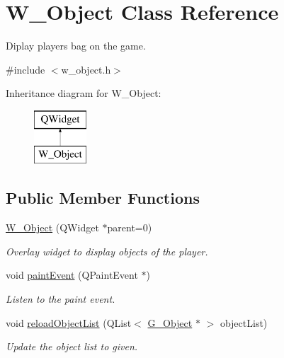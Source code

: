 \hypertarget{class_w___object}{}\section{W\+\_\+\+Object Class Reference}
\label{class_w___object}


Diplay player\textquotesingle{}s bag on the game.  




{\ttfamily \#include $<$w\+\_\+object.\+h$>$}

Inheritance diagram for W\+\_\+\+Object\+:\begin{figure}[H]
\begin{center}
\leavevmode
\includegraphics[height=2.000000cm]{class_w___object}
\end{center}
\end{figure}
\subsection*{Public Member Functions}
\begin{DoxyCompactItemize}
\item 
\hyperlink{class_w___object_a0b72570f71d65c67ca649cc76c3077cf}{W\+\_\+\+Object} (Q\+Widget $\ast$parent=0)
\begin{DoxyCompactList}\small\item\em Overlay widget to display objects of the player. \end{DoxyCompactList}\item 
\hypertarget{class_w___object_ab0e3dcaabbbcfeab50b4a449e667b56d}{}void \hyperlink{class_w___object_ab0e3dcaabbbcfeab50b4a449e667b56d}{paint\+Event} (Q\+Paint\+Event $\ast$)\label{class_w___object_ab0e3dcaabbbcfeab50b4a449e667b56d}

\begin{DoxyCompactList}\small\item\em Listen to the paint event. \end{DoxyCompactList}\item 
void \hyperlink{class_w___object_a7ac4e7ab3ebae9f9d0c4845dc75d0204}{reload\+Object\+List} (Q\+List$<$ \hyperlink{class_g___object}{G\+\_\+\+Object} $\ast$ $>$ object\+List)
\begin{DoxyCompactList}\small\item\em Update the object list to given. \end{DoxyCompactList}\end{DoxyCompactItemize}


